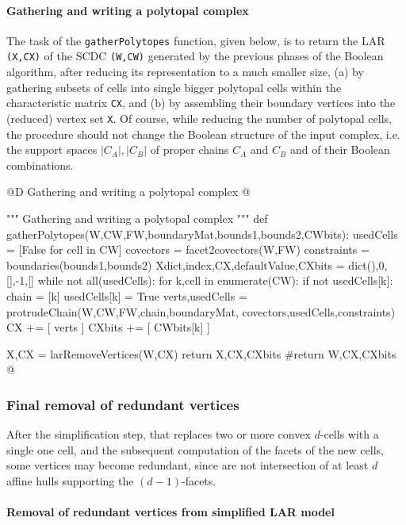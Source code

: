 \documentclass[11pt,oneside]{article}	%
\begin{document}
\paragraph{Gathering and writing a polytopal complex}
The task of the \texttt{gatherPolytopes} function, given below, is to return the LAR \texttt{(X,CX)} of the SCDC \texttt{(W,CW)} generated by the previous phases of the Boolean algorithm, after reducing its representation to a much smaller size, (a) by gathering subsets of cells into single bigger polytopal cells within the characteristic matrix \texttt{CX}, and (b) by assembling their boundary vertices into the (reduced) vertex set \texttt{X}. Of course, while reducing the number of polytopal cells, the procedure should not change the Boolean structure of the input complex, i.e. the support spaces $|C_A|, |C_B|$ of proper chains $C_A$ and $C_B$ and of their Boolean combinations.

@D Gathering and writing a polytopal complex
@{""" Gathering and writing a polytopal complex """
def gatherPolytopes(W,CW,FW,boundaryMat,bounds1,bounds2,CWbits):
	usedCells = [False for cell in CW]
	covectors = facet2covectors(W,FW)
	constraints = boundaries(bounds1,bounds2)
	Xdict,index,CX,defaultValue,CXbits = dict(),0,[],-1,[]
	while not all(usedCells):
		for k,cell in enumerate(CW):
			if not usedCells[k]:
				chain = [k]
				usedCells[k] = True
				verts,usedCells = protrudeChain(W,CW,FW,chain,boundaryMat,
									covectors,usedCells,constraints)
				CX += [ verts ]
				CXbits += [ CWbits[k] ]
				
	X,CX = larRemoveVertices(W,CX)
	return X,CX,CXbits
	#return W,CX,CXbits
@}

\subsubsection{Final removal of redundant vertices}

After the simplification step, that replaces two or more convex $d$-cells with a single one cell,
and the subsequent computation of the facets of the new cells, some vertices may become redundant,
since are not intersection of at least $d$ affine hulls supporting the $(d-1)$-facets.

\paragraph{Removal of redundant vertices from simplified LAR model}
\end{document}
